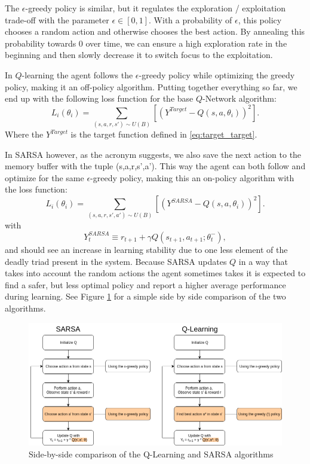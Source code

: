 The $\epsilon$-greedy policy is similar, but it regulates the exploration / exploitation trade-off with the parameter $\epsilon \in [0,1]$. With a probability of $\epsilon$, this policy chooses a random action and otherwise chooses the best action. By annealing this probability towards 0 over time, we can ensure a high exploration rate in the beginning and then slowly decrease it to switch focus to the exploitation.

In $Q$-learning the agent follows the $\epsilon$-greedy policy while optimizing the greedy policy, making it an off-policy algorithm. Putting together everything so far, we end up with the following loss function for the base $Q$-Network algorithm:
\begin{equation}
    L_i(\theta_i)= \sum_{(s,a,r,s') \sim U(B)}[(Y^{Target}-Q(s,a,\theta_i))^2].
\end{equation}
Where the $Y^{Target}$ is the target function defined in \eqref{eq:target_target}.

In SARSA however, as the acronym suggests, we also save the next action to the memory buffer with the tuple (s,a,r,s',a'). This way the agent can both follow and optimize for the same $\epsilon$-greedy policy, making this an on-policy algorithm with the loss function:
\begin{equation}
    L_i(\theta_i)= \sum_{(s,a,r,s',a') \sim U(B)}[(Y^{SARSA}-Q(s,a,\theta_i))^2].
\end{equation}
with
\begin{equation}\label{eq:target_sarsa}
    Y^{SARSA}_t \equiv r_{t+1} + \gamma Q(s_{t+1}, a_{t+1}; \theta_t^-),
\end{equation}
and should see an increase in learning stability due to one less element of the deadly triad present in the system. Because SARSA updates $Q$ in a way that takes into account the random actions the agent sometimes takes it is expected to find a safer, but less optimal policy \citep{sutton_barto_2018} and report a higher average performance during learning. See Figure \ref{fig:ql_sarsa} for a simple side by side comparison of the two algorithms.

\begin{figure}[h]
    \centering
    \includegraphics[width=1\linewidth]{img/SARSA_QL.png}
    \caption{Side-by-side comparison of the Q-Learning and SARSA algorithms}
    \label{fig:ql_sarsa}
\end{figure}


